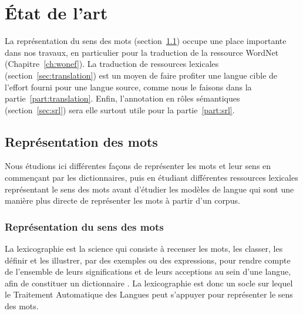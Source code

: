 \chapter{État de l'art} 
\label{ch:etatdelart} 


La représentation du sens des mots (section~\ref{sec:mots}) occupe une place
importante dans nos travaux, en particulier pour la traduction de la ressource
WordNet (Chapitre~\ref{ch:wonef}). La traduction de ressources lexicales
(section~\ref{sec:translation}) est un moyen de faire profiter une langue cible
de l'effort fourni pour une langue source, comme nous le faisons dans la
partie~\ref{part:translation}. Enfin, l'annotation en rôles sémantiques
(section~\ref{sec:srl}) sera elle surtout utile pour la partie~\ref{part:srl}.

\section{Représentation des mots}
\label{sec:mots}

Nous étudions ici différentes façons de représenter les mots et leur sens en
commençant par les dictionnaires, puis en étudiant différentes ressources
lexicales représentant le sens des mots avant d'étudier les modèles de langue
qui sont une manière plus directe de représenter les mots à partir d'un corpus.

\subsection{Représentation du sens des mots}

La lexicographie est la science qui consiste à recenser les mots, les classer,
les définir et les illustrer, par des exemples ou des expressions, pour rendre
compte de l'ensemble de leurs significations et de leurs acceptions au sein
d'une langue, afin de constituer un dictionnaire
\citep{wikipedia2014lexicographie}. La lexicographie est donc un socle sur
lequel le Traitement Automatique des Langues peut s'appuyer pour représenter le
sens des mots.

